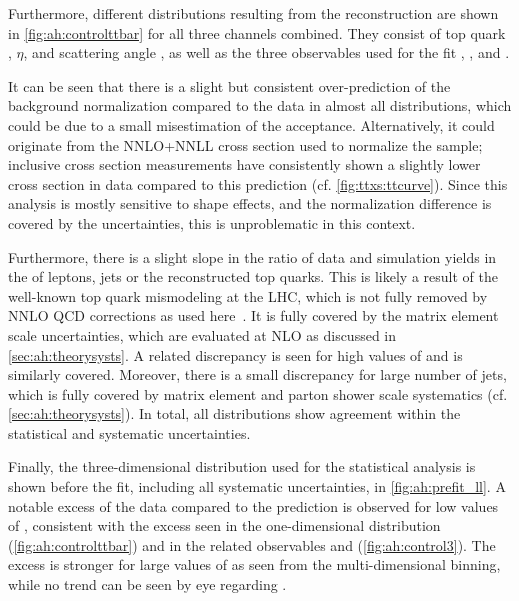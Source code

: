 Furthermore, different distributions resulting from the \ttbar reconstruction are shown in \cref{fig:ah:controlttbar} for all three channels combined. They consist of top quark \pt, $\eta$, and scattering angle \cost, as well as the three observables used for the fit \mtt, \chel, and \chan.

It can be seen that there is a slight but consistent over-prediction of the background normalization compared to the data in almost all distributions, which could be due to a small misestimation of the acceptance. Alternatively, it could originate from the NNLO+NNLL \ttbar cross section used to normalize the sample; inclusive cross section measurements have consistently shown a slightly lower cross section in data compared to this prediction (cf. \cref{fig:ttxs:ttcurve}). Since this analysis is mostly sensitive to shape effects, and the normalization difference is covered by the uncertainties, this is unproblematic in this context.

Furthermore, there is a slight slope in the ratio of data and simulation yields in the \pt of leptons, jets or the reconstructed top quarks. This is likely a result of the well-known top quark \pt mismodeling at the LHC, which is not fully removed by NNLO QCD corrections as used here~\cite{CMS:TOP-16-008,CMS:TOP-17-014}. It is fully covered by the matrix element scale uncertainties, which are evaluated at NLO as discussed in \cref{sec:ah:theorysysts}. A related discrepancy is seen for high values of \abseta and is similarly covered. Moreover, there is a small discrepancy for large number of jets, which is fully covered by matrix element and parton shower scale systematics (cf. \cref{sec:ah:theorysysts}). In total, all distributions show agreement within the statistical and systematic uncertainties.

Finally, the three-dimensional \mttchelchan distribution used for the statistical analysis is shown before the fit, including all systematic uncertainties, in \cref{fig:ah:prefit_ll}. A notable excess of the data compared to the prediction is observed for low values of \mtt, consistent with the excess seen in the one-dimensional \mtt distribution (\cref{fig:ah:controlttbar}) and in the related observables \mll and \mbbll (\cref{fig:ah:control3}). The excess is stronger for large values of \chel as seen from the multi-dimensional binning, while no trend can be seen by eye regarding \chan.

